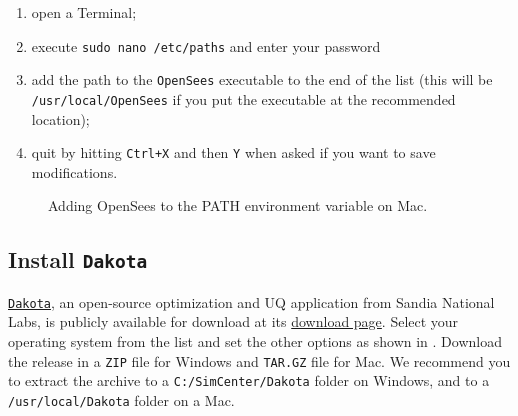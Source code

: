 \begin{enumerate}
\begin{enumerate}
    \item open a Terminal;
    \item execute \texttt{sudo nano /etc/paths} and enter your password
    \item add the path to the \texttt{OpenSees} executable to the end of the list (this will be \texttt{/usr/local/OpenSees} if you put the executable at the recommended location);
    \item quit by hitting \texttt{Ctrl+X} and then \texttt{Y} when asked if you want to save modifications.
\end{enumerate}

\begin{figure}[!htbp]
  \caption{Adding OpenSees to the PATH environment variable on Mac.}
  \label{fig:add_env_path_Mac}
\end{figure}
\end{enumerate}


\subsection{Install \texttt{Dakota}}

\href{http://dakota.sandia.gov}{\texttt{Dakota}}, an open-source  optimization and UQ application from Sandia National Labs, is publicly available for download at its \href{http://dakota.sandia.gov/download.html}{download page}. Select your operating system from the list and set the other options as shown in  . Download the release in a \texttt{ZIP} file for Windows and \texttt{TAR.GZ} file for Mac. We recommend you to extract the archive to a \texttt{C:/SimCenter/Dakota} folder on Windows, and to a \texttt{/usr/local/Dakota} folder on a Mac.


